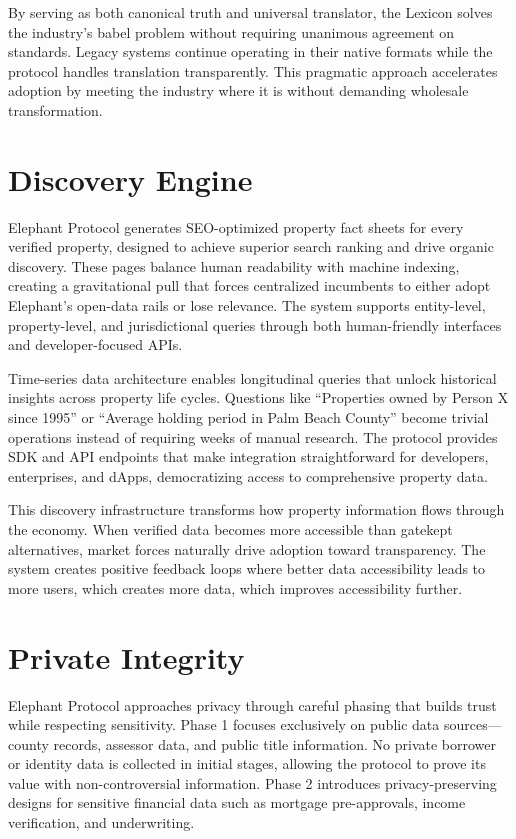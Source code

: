 By serving as both canonical truth and universal translator, the Lexicon solves the industry's babel problem without requiring unanimous agreement on standards. Legacy systems continue operating in their native formats while the protocol handles translation transparently. This pragmatic approach accelerates adoption by meeting the industry where it is without demanding wholesale transformation.

\section{Discovery Engine}

Elephant Protocol generates SEO-optimized property fact sheets for every verified property, designed to achieve superior search ranking and drive organic discovery. These pages balance human readability with machine indexing, creating a gravitational pull that forces centralized incumbents to either adopt Elephant's open-data rails or lose relevance. The system supports entity-level, property-level, and jurisdictional queries through both human-friendly interfaces and developer-focused APIs.

Time-series data architecture enables longitudinal queries that unlock historical insights across property life cycles. Questions like ``Properties owned by Person X since 1995'' or ``Average holding period in Palm Beach County'' become trivial operations instead of requiring weeks of manual research. The protocol provides SDK and API endpoints that make integration straightforward for developers, enterprises, and dApps, democratizing access to comprehensive property data.

This discovery infrastructure transforms how property information flows through the economy. When verified data becomes more accessible than gatekept alternatives, market forces naturally drive adoption toward transparency. The system creates positive feedback loops where better data accessibility leads to more users, which creates more data, which improves accessibility further.

\section{Private Integrity}

Elephant Protocol approaches privacy through careful phasing that builds trust while respecting sensitivity. Phase 1 focuses exclusively on public data sources---county records, assessor data, and public title information. No private borrower or identity data is collected in initial stages, allowing the protocol to prove its value with non-controversial information. Phase 2 introduces privacy-preserving designs for sensitive financial data such as mortgage pre-approvals, income verification, and underwriting.

